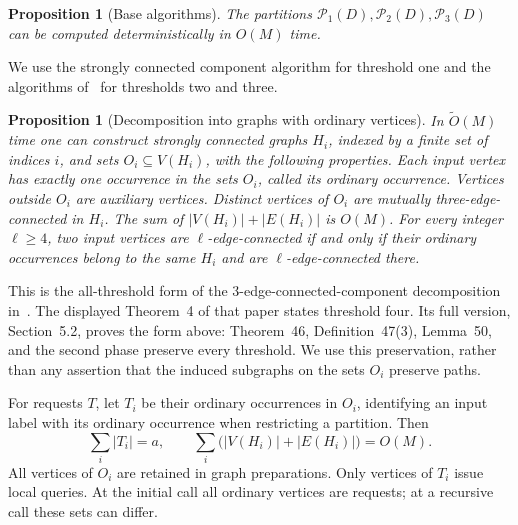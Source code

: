 \documentclass[11pt]{article}
\newtheorem{proposition}[theorem]{Proposition}
\theoremstyle{definition}
\theoremstyle{remark}
\newcommand{\PP}{\mathcal P}
\newcommand{\OO}{\widetilde O}
\begin{document}
\begin{proposition}[Base algorithms]
\label{prop:bases}
The partitions \(\PP_1(D),\PP_2(D),\PP_3(D)\) can be computed deterministically in \(O(M)\) time.
\end{proposition}
We use the strongly connected component algorithm for threshold one and the algorithms of~\cite{GIP20,GIK24} for thresholds two and three.

\begin{proposition}[Decomposition into graphs with ordinary vertices]
\label{prop:decomposition}
In \(\OO(M)\) time one can construct strongly connected graphs \(H_i\), indexed by a finite set of indices \(i\), and sets \(O_i\subseteq V(H_i)\), with the following properties. Each input vertex has exactly one occurrence in the sets \(O_i\), called its ordinary occurrence. Vertices outside \(O_i\) are auxiliary vertices. Distinct vertices of \(O_i\) are mutually three-edge-connected in \(H_i\). The sum of \(|V(H_i)|+|E(H_i)|\) is \(O(M)\). For every integer \(\ell\ge4\), two input vertices are \(\ell\)-edge-connected if and only if their ordinary occurrences belong to the same \(H_i\) and are \(\ell\)-edge-connected there.
\end{proposition}
This is the all-threshold form of the 3-edge-connected-component decomposition in~\cite{GKKPP26}. The displayed Theorem~4 of that paper states threshold four. Its full version, Section~5.2, proves the form above: Theorem~46, Definition~47(3), Lemma~50, and the second phase preserve every threshold. We use this preservation, rather than any assertion that the induced subgraphs on the sets \(O_i\) preserve paths.

For requests \(T\), let \(T_i\) be their ordinary occurrences in \(O_i\), identifying an input label with its ordinary occurrence when restricting a partition. Then
\begin{equation}
 \sum_i |T_i|=a,\qquad \sum_i\bigl(|V(H_i)|+|E(H_i)|\bigr)=O(M).
 \label{eq:decomposition-sums}
\end{equation}
All vertices of \(O_i\) are retained in graph preparations. Only vertices of \(T_i\) issue local queries. At the initial call all ordinary vertices are requests; at a recursive call these sets can differ.
\end{document}
